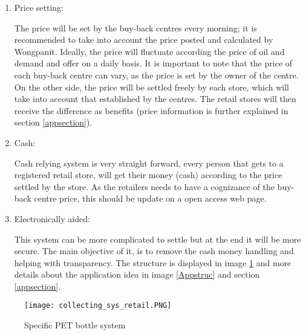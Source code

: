 \documentclass[twoside,a4paper,12pt]{report}
\begin{document}
\begin{enumerate}
    \item Price setting:
    
    The price will be set by the buy-back centres every morning; it is recommended to take into account the price posted and calculated by Wongpanit. Ideally, the price will fluctuate according the price of oil and demand and offer on a daily basis. It is important to note that the price of each buy-back centre can vary, as the price is set by the owner of the centre. On the other side, the price will be settled freely by each store, which will take into account that established by the centres. The retail stores will then receive the difference as benefits (price information is further explained in section \ref{appsection}).
    
    \item Cash:
    
    Cash relying system is very straight forward, every person that gets to a registered retail store, will get their money (cash) according to the price settled by the store. As the retailers needs to have a cognizance of the buy-back centre price, this should be update on a open access web page.
    
    \item Electronically aided:
    
    This system can be more complicated to settle but at the end it will be more secure. The main objective of it, is to remove the cash money handling and helping with transparency. The structure is displayed in image \ref{spepetbottle} and more details about the application idea in image \ref{Appstruc} and section \ref{appsection}. 
    
\end{enumerate}
\begin{figure}
    \centering
    \texttt{[image: collecting\_sys\_retail.PNG]}
    \caption{Specific PET bottle system}
     \label{spepetbottle} 
\end{figure}
\end{document}
